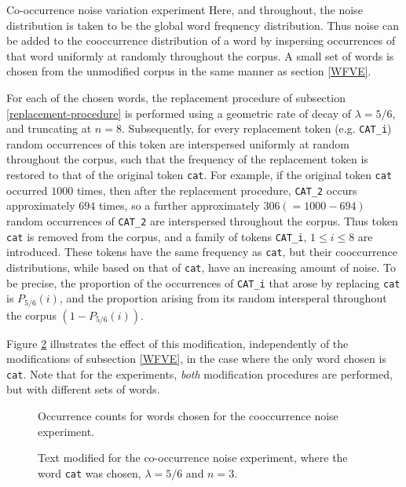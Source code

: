 \documentclass{article} %
\newcommand{\word}[1]{\texttt{#1}}
\begin{document}
\begin{section}{Co-occurrence noise variation experiment}\label{CNVE}
Here, and throughout, the noise distribution is taken to be the global word frequency distribution.
Thus noise can be added to the cooccurrence distribution of a word by inspersing occurrences of that word uniformly at randomly throughout the corpus.
A small set of words is chosen from the unmodified corpus in the same manner as section \ref{WFVE}.

For each of the chosen words, the replacement procedure of subsection \ref{replacement-procedure} is performed using a geometric rate of decay of $\lambda = 5/6$, and truncating at $n=8$.
Subsequently, for every replacement token (e.g. \word{CAT\_i}) random occurrences of this token are interspersed uniformly at random throughout the corpus, such that the frequency of the replacement token is restored to that of the original token \word{cat}.
For example, if the original token \word{cat} occurred $1000$ times, then after the replacement procedure, \word{CAT\_2} occurs approximately $694$ times, so a further approximately $306 (=1000 - 694)$ random occurrences of \word{CAT\_2} are interspersed throughout the corpus.
Thus token \word{cat} is removed from the corpus, and a family of tokens \word{CAT\_i}, $1 \leqslant i \leqslant 8$ are introduced.
These tokens have the same frequency as \word{cat}, but their cooccurrence distributions, while based on that of \word{cat}, have an increasing amount of noise.
To be precise, the proportion of the occurrences of \word{CAT\_i} that arose by replacing \word{cat} is $P_{5/6}(i)$, and the proportion arising from its random intersperal throughout the corpus $(1 - P_{5/6}(i))$.

Figure \ref{fig:cooccurrence-noise-experiment-text} illustrates the effect of this modification, independently of the modifications of subsection \ref{WFVE}, in the case where the only word chosen is \word{cat}.
Note that for the experiments, \emph{both} modification procedures are performed, but with different sets of words.

\begin{figure}
	
	\label{fig:cooccurrence-noise-counts}
	\caption{Occurrence counts for words chosen for the cooccurrence noise experiment. }
\end{figure}

\begin{figure}
	
	\caption{Text modified for the co-occurrence noise experiment, where the word \word{cat} was chosen, $\lambda = 5/6$ and $n=3$.}
\label{fig:cooccurrence-noise-experiment-text}
\end{figure}


\end{section}
\end{document}

